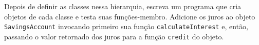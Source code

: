 \documentclass[fleqn]{article}
\begin{document}
\begin{enumerate}
{    Depois de definir as classes nessa hierarquia, escreva um programa que cria objetos de cada classe e testa suas funções-membro. Adicione os juros ao objeto \texttt{SavingsAccount} invocando primeiro sua função \texttt{calculateInterest} e, então, passando o valor retornado dos juros para a função \texttt{credit} do objeto.
  }


\end{enumerate}
\end{document}
